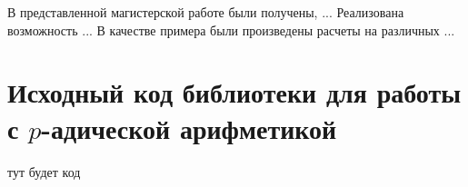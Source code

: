 \documentclass[master, och, diploma, times]{sty/SCWorks}
\theoremstyle{plain}
\theoremstyle{definition}
\begin{document}
 

\conclusion
В представленной магистерской работе были получены, ...
Реализована возможность ...
В качестве примера были произведены расчеты на различных ...




\appendix

\section{Исходный код библиотеки для работы с $p$-адической арифметикой}

тут будет код
\end{document}
